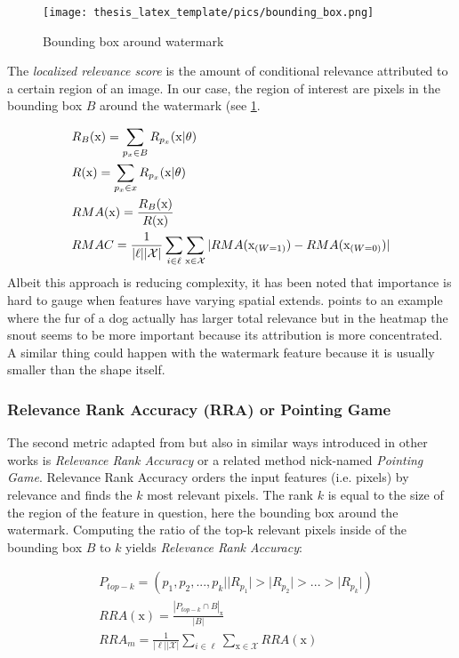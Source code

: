 \begin{figure}
    \centering
    \texttt{[image: thesis\_latex\_template/pics/bounding\_box.png]}
    \caption{Bounding box around watermark}
    \label{fig:bounding_box}
\end{figure}

The \textit{localized relevance score} is the amount of conditional relevance attributed to a certain region of an image. In our case, the region of interest are pixels in the bounding box $B$ around the watermark (see \cref{fig:bounding_box}. 

\begin{align*}
\displaystyle
& R_B(\mathrm{x}) = \sum_{p_x \in B} R_{p_x}(\mathrm{x} | \theta)\\
& R(\mathrm{x}) = \sum_{p_x \in x} R_{p_x}(\mathrm{x} | \theta) \\
& RMA(\mathrm{x}) = \frac{R_B(\mathrm{x})}{R(\mathrm{x})} \\
& RMAC =\frac{1}{|\ell| |\mathcal{X}|} \sum_{i \in \ell} \sum_{\mathrm{x} \in \mathcal{X}} |RMA(\mathrm{x}_{(W=1)}) - RMA(\mathrm{x}_{(W=0)})|
\end{align*}
Albeit this approach is reducing complexity, it has been noted that importance is hard to gauge when features have varying spatial extends. \cite{Achtibat2022} points to an example where the fur of a dog actually has larger total relevance but in the heatmap the snout seems to be more important because its attribution is more concentrated. A similar thing could happen with the watermark feature because it is usually smaller than the shape itself. 

\subsubsection{Relevance Rank Accuracy (RRA) or Pointing Game}
The second metric adapted from \cite{Arras2022} but also in similar ways introduced in other works is \textit{Relevance Rank Accuracy} or a related method nick-named \textit{Pointing Game}.  
Relevance Rank Accuracy orders the input features (i.e. pixels) by relevance and finds the $k$ most relevant pixels. The rank $k$ is equal to the size of the region of the feature in question, here the bounding box around the watermark. Computing the ratio of the top-k relevant pixels inside of the bounding box $B$ to $k$ yields \textit{Relevance Rank Accuracy}:

\begin{align*}
& P_{top-k} = (p_1, p_2,...,p_k | |R_{p_1}| > |R_{p_2}| > ... > |R_{p_k}| ) \\
& RRA(\mathrm{x}) = \frac{|P_{top-k} \cap B|_\mathrm{x}}{|B|} \\
& RRA_m =\frac{1}{|\ell| |\mathcal{X}|} \sum_{i \in \ell} \sum_{\mathrm{x} \in \mathcal{X}} RRA(\mathrm{x})
\end{align*}

